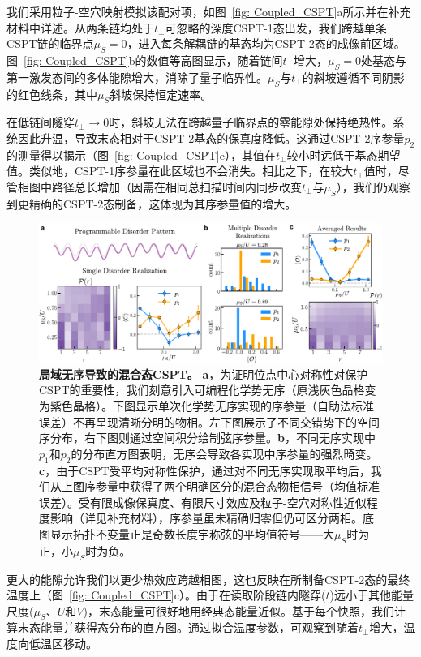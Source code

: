 \documentclass[preprint,superscriptaddress,floatfix,nofootinbib]{revtex4-2}
\begin{document}
我们采用粒子-空穴映射模拟该配对项，如图~\ref{fig: Coupled_CSPT}a所示并在补充材料中详述。从两条链均处于$t_\perp$可忽略的深度CSPT-1态出发，我们跨越单条CSPT链的临界点$\mu_S=0$，进入每条解耦链的基态均为CSPT-2态的成像前区域。图~\ref{fig: Coupled_CSPT}b的数值等高图显示，随着链间$t_\perp$增大，$\mu_S=0$处基态与第一激发态间的多体能隙增大，消除了量子临界性。$\mu_S$与$t_\perp$的斜坡遵循不同阴影的红色线条，其中$\mu_S$斜坡保持恒定速率。

在低链间隧穿$t_\perp \rightarrow 0$时，斜坡无法在跨越量子临界点的零能隙处保持绝热性。系统因此升温，导致末态相对于CSPT-2基态的保真度降低。这通过CSPT-2序参量$p_2$的测量得以揭示（图~\ref{fig: Coupled_CSPT}e），其值在$t_{\perp}$较小时远低于基态期望值。类似地，CSPT-1序参量在此区域也不会消失。相比之下，在较大$t_\perp$值时，尽管相图中路径总长增加（因需在相同总扫描时间内同步改变$t_\perp$与$\mu_S$），我们仍观察到更精确的CSPT-2态制备，这体现为其序参量值的增大。
\begin{figure}
    \centering
    \includegraphics[width=\textwidth]{figures/CSPT_average.pdf}
    \caption{\textbf{局域无序导致的混合态CSPT。} \textbf{a}，为证明位点中心对称性对保护CSPT的重要性，我们刻意引入可编程化学势无序（原浅灰色晶格变为紫色晶格）。下图显示单次化学势无序实现的序参量（自助法标准误差）不再呈现清晰分明的物相。左下图展示了不同交错势下的空间序分布，右下图则通过空间积分绘制弦序参量。\textbf{b}，不同无序实现中$p_1$和$p_2$的分布直方图表明，无序会导致各实现中序参量的强烈畸变。\textbf{c}，由于CSPT受平均对称性保护，通过对不同无序实现取平均后，我们从上图序参量中获得了两个明确区分的混合态物相信号（均值标准误差）。受有限成像保真度、有限尺寸效应及粒子-空穴对称性近似程度影响（详见补充材料），序参量虽未精确归零但仍可区分两相。底图显示拓扑不变量正是奇数长度宇称弦的平均值符号——大$\mu_S$时为正，小$\mu_S$时为负。}
    \label{fig: CSPT_average}
\end{figure}

更大的能隙允许我们以更少热效应跨越相图，这也反映在所制备CSPT-2态的最终温度上（图~\ref{fig: Coupled_CSPT}c）。由于在读取阶段链内隧穿($t$)远小于其他能量尺度($\mu_S$、$U$和$V$)，末态能量可很好地用经典态能量近似。基于每个快照，我们计算末态能量并获得态分布的直方图。通过拟合温度参数，可观察到随着$t_\perp$增大，温度向低温区移动。
\end{document}
